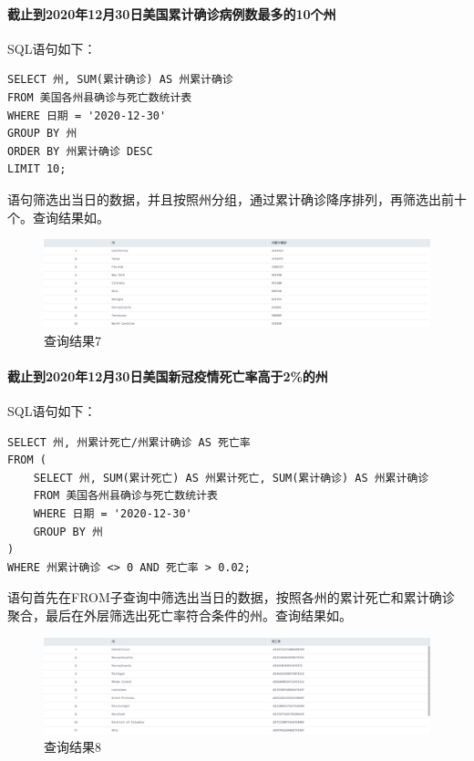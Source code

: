 \documentclass[lang=cn,11pt,a4paper,cite=authornum]{paper}
\begin{document}
\paragraph{截止到2020年12月30日美国累计确诊病例数最多的10个州} SQL语句如下：

\begin{code}
\begin{verbatim}
SELECT 州, SUM(累计确诊) AS 州累计确诊
FROM 美国各州县确诊与死亡数统计表
WHERE 日期 = '2020-12-30'
GROUP BY 州
ORDER BY 州累计确诊 DESC
LIMIT 10;
\end{verbatim}
\end{code}

语句筛选出当日的数据，并且按照州分组，通过累计确诊降序排列，再筛选出前十个。查询结果如。

\begin{figure}[!htb]
    \centering
    \includegraphics[width=\textwidth]{./images/lab1_query7.png}
    \caption{查询结果7\label{fig:query7}}
\end{figure}

\paragraph{截止到2020年12月30日美国新冠疫情死亡率高于2\%的州} SQL语句如下：

\begin{code}
\begin{verbatim}
SELECT 州, 州累计死亡/州累计确诊 AS 死亡率
FROM (
    SELECT 州, SUM(累计死亡) AS 州累计死亡, SUM(累计确诊) AS 州累计确诊
    FROM 美国各州县确诊与死亡数统计表
    WHERE 日期 = '2020-12-30'
    GROUP BY 州
)
WHERE 州累计确诊 <> 0 AND 死亡率 > 0.02;
\end{verbatim}
\end{code}

语句首先在FROM子查询中筛选出当日的数据，按照各州的累计死亡和累计确诊聚合，最后在外层筛选出死亡率符合条件的州。查询结果如。

\begin{figure}[!htb]
    \centering
    \includegraphics[width=\textwidth]{./images/lab1_query8.png}
    \caption{查询结果8\label{fig:query8}}
\end{figure}
\end{document}
